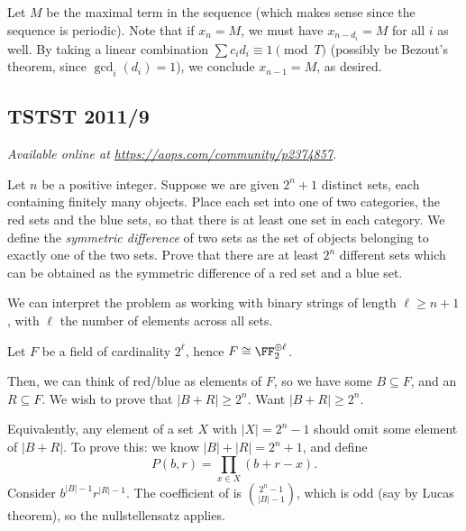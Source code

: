 \documentclass[11pt]{scrartcl}
\begin{document}
Let $M$ be the maximal term in the sequence
(which makes sense since the sequence is periodic).
Note that if $x_n = M$, we must have
$x_{n-d_i} = M$ for all $i$ as well.
By taking a linear combination $\sum c_i d_i \equiv 1 \pmod T$
(possibly be Bezout's theorem, since $\gcd_i(d_i)=1$),
we conclude $x_{n-1} = M$, as desired.
\pagebreak

\subsection{TSTST 2011/9}
\textsl{Available online at \url{https://aops.com/community/p2374857}.}
\begin{mdframed}[style=mdpurplebox,frametitle={Problem statement}]
Let $n$ be a positive integer.
Suppose we are given $2^n+1$ distinct sets,
each containing finitely many objects.
Place each set into one of two categories, the red sets and the blue sets,
so that there is at least one set in each category.
We define the \textit{symmetric difference} of two sets as
the set of objects belonging to exactly one of the two sets.
Prove that there are at least $2^n$ different sets which
can be obtained as the symmetric difference of a red set and a blue set.
\end{mdframed}
We can interpret the problem as working with
binary strings of length $\ell \ge n+1$,
with $\ell$ the number of elements across all sets.

Let $F$ be a field of cardinality $2^\ell$,
hence $F \cong \FF_2^{\oplus \ell}$.

Then, we can think of red/blue as elements of $F$,
so we have some $B \subseteq F$, and an $R \subseteq F$.
We wish to prove that $|B+R| \ge 2^n$.
Want $|B + R| \ge 2^n$.

Equivalently, any element of a set $X$ with $|X| = 2^n - 1$
should omit some element of $|B+R|$.
To prove this: we know $|B| + |R| = 2^n+1$, and define
\[ P(b,r) = \prod_{x \in X} (b+r-x). \]
Consider $b^{|B|-1} r^{|R|-1}$.
The coefficient of is $\binom{2^n-1}{|B|-1}$,
which is odd (say by Lucas theorem),
so the nullstellensatz applies.
\pagebreak
\end{document}
